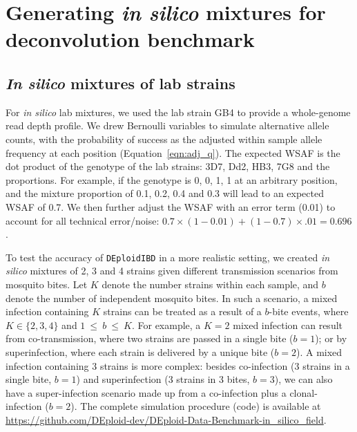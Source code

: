 \documentclass[9pt]{article}
\begin{document}
\newpage

\section{Generating {\it in silico} mixtures for deconvolution benchmark}
\subsection{{\it In silico} mixtures of lab strains}
For {\it in silico} lab mixtures, we used the lab strain GB4 to provide a whole-genome read depth profile. We drew Bernoulli variables to simulate alternative allele counts, with the probability of success as the adjusted within sample allele frequency at each position (Equation~\ref{eqn:adj_q}). The expected WSAF is the dot product of the genotype of the lab strains: 3D7, Dd2, HB3, 7G8 and the proportions. For example, if the genotype is 0, 0, 1, 1 at an arbitrary position, and the mixture proportion of 0.1, 0.2, 0.4 and 0.3 will lead to an expected WSAF of 0.7. We then further adjust the WSAF with an error term (0.01) to account for all technical error/noise: $0.7 \times(1-0.01) + (1-0.7) \times.01 = 0.696$.

\vspace{.5cm}
To test the accuracy of \texttt{DEploidIBD} in a more realistic setting, we created {\it in silico} mixtures of 2, 3 and 4 strains given different transmission scenarios from mosquito bites. Let $K$ denote the number strains within each sample, and $b$ denote the number of independent mosquito bites. In such a scenario, a mixed infection containing $K$ strains can be treated as a result of a $b$-bite events, where $K \in \{2,3,4\}$ and $1~{\leq}~{b}~{\leq}~K$. For example, a $K=2$ mixed infection can result from co-transmission, where two strains are passed in a single bite ($b=1$); or by superinfection, where each strain is delivered by a unique bite ($b=2$). A mixed infection containing 3 strains is more complex: besides co-infection (3 strains in a single bite, $b=1$) and superinfection (3 strains in 3 bites, $b=3$), we can also have a super-infection scenario made up from a co-infection plus a clonal-infection ($b=2$). The complete simulation procedure (code) is available at \url{https://github.com/DEploid-dev/DEploid-Data-Benchmark-in_silico_field}.
\end{document}
